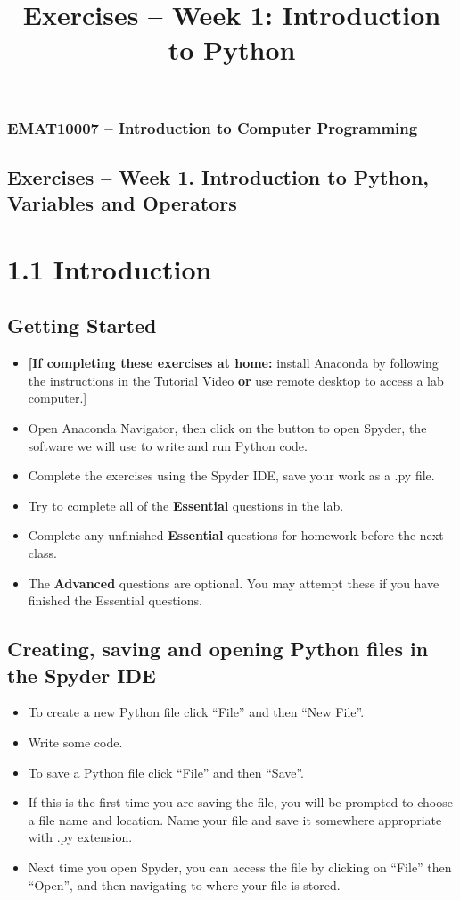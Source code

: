 \documentclass[12pt]{article}
\begin{document}
\title{Exercises -- Week 1: Introduction to Python}
\subsubsection*{EMAT10007 -- Introduction to Computer Programming}
\subsection*{\Large Exercises -- Week 1. Introduction to Python, Variables and Operators}

\section*{1.1 Introduction}

\subsection*{Getting Started}

\begin{itemize}
    \item{{\bf [If completing these exercises at home:} install Anaconda by following the instructions in the Tutorial Video {\bf or} use remote desktop to access a lab computer.]} 
    \item{Open Anaconda Navigator, then click on the button to open Spyder, the software we will use to write and run Python code.}
    \item{Complete the exercises using the Spyder IDE, save your work as a .py file.}
    \item{Try to complete all of the {\bf Essential} questions in the lab.}
    \item{Complete any unfinished {\bf Essential} questions for homework before the next class.}
    \item{The {\bf Advanced} questions are optional. You may attempt these if you have finished the Essential questions.}
\end{itemize}

\subsection*{Creating, saving and opening Python files in the Spyder IDE}
     
\begin{itemize}
    \item To create a new Python file click ``File'' and then ``New File''.
    \item Write some code.
    \item To save a Python file click ``File'' and then ``Save''.
    \item If this is the first time you are saving the file, you will be prompted to choose a file name and location. Name your file and save it somewhere appropriate with .py extension. 
    \item Next time you open Spyder, you can access the file by clicking on ``File'' then ``Open'', and then navigating to where your file is stored.
\end{itemize}
    
\end{document}
